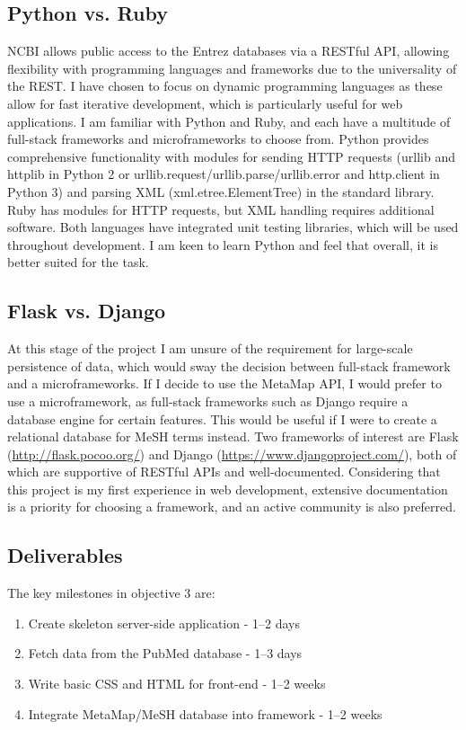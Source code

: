 \documentclass[PROP_AGutteridge_CS.tex]{subfiles}
\begin{document}
\subsection{Python vs. Ruby}
NCBI allows public access to the Entrez databases via a RESTful API, allowing flexibility with programming languages and frameworks due to the universality of the REST. I have chosen to focus on dynamic programming languages as these allow for fast iterative development, which is particularly useful for web applications. I am familiar with Python and Ruby, and each have a multitude of full-stack frameworks and microframeworks to choose from. Python provides comprehensive functionality with modules for sending HTTP requests (urllib and httplib in Python 2 or urllib.request/urllib.parse/urllib.error and http.client in Python 3) and parsing XML (xml.etree.ElementTree) in the standard library. Ruby has modules for HTTP requests, but XML handling requires additional software. Both languages have integrated unit testing libraries, which will be used throughout development. I am keen to learn Python and feel that overall, it is better suited for the task.

\subsection{Flask vs. Django}
At this stage of the project I am unsure of the requirement for large-scale persistence of data, which would sway the decision between full-stack framework and a microframeworks. If I decide to use the MetaMap API, I would prefer to use a microframework, as full-stack frameworks such as Django require a database engine for certain features. This would be useful if I were to create a relational database for MeSH terms instead. Two frameworks of interest are Flask (\url{http://flask.pocoo.org/}) and Django (\url{https://www.djangoproject.com/}), both of which are supportive of RESTful APIs and well-documented. Considering that this project is my first experience in web development, extensive documentation is a priority for choosing a framework, and an active community is also preferred. 

\subsection{Deliverables}
The key milestones in objective 3 are:
\begin{enumerate}
\item{Create skeleton server-side application - 1--2 days} 
\item{Fetch data from the PubMed database - 1--3 days}
\item{Write basic CSS and HTML for front-end - 1--2 weeks}
\item{Integrate MetaMap/MeSH database into framework - 1--2 weeks}
\end{enumerate}
\end{document}
